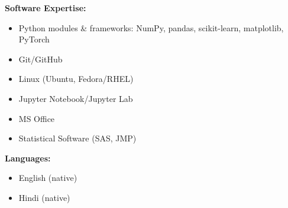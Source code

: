 \documentclass{article}
\begin{document}
		\noindent \textbf{Software Expertise:}
		\begin{itemize}[nolistsep]
				\item Python modules \& frameworks: NumPy, pandas, scikit-learn, matplotlib, PyTorch
		\end{itemize}
		\vspace{-1.0em}
		\begin{multicols}{2}
				\begin{itemize}[noitemsep, nolistsep]
						\item Git/GitHub 
						\item Linux (Ubuntu, Fedora/RHEL) 
						\item Jupyter Notebook/Jupyter Lab 
						\item MS Office 
						\item Statistical Software (SAS, JMP)
				\end{itemize}
		\end{multicols}

		\noindent \textbf{Languages:}
		\begin{itemize}[noitemsep, nolistsep]
				\item English (native)
				\item Hindi (native)
		\end{itemize}
\end{document}
